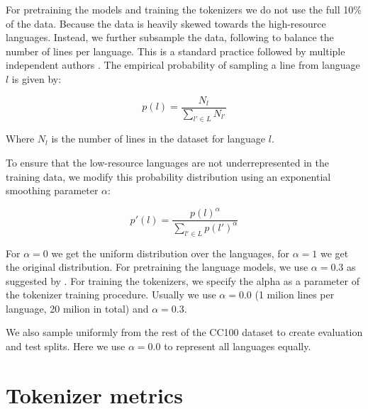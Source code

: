 
For pretraining the models and training the tokenizers we do not use the full 10\% of the data. Because the data is heavily skewed towards the high-resource languages. Instead, we further subsample the data, following \citet{conneau_unsupervised_2020-1} to balance the number of lines per language. This is a standard practice followed by multiple independent authors . The empirical probability of sampling a line from language $l$ is given by:

\begin{equation}
    p(l) = \frac{N_l}{\sum_{l' \in L} N_{l'}}
\end{equation}

Where $N_l$ is the number of lines in the dataset for language $l$.

To ensure that the low-resource languages are not underrepresented in the training data, we modify this probability distribution using an exponential smoothing parameter $\alpha$:

\begin{equation}
    p'(l) = \frac{p(l)^\alpha}{\sum_{l' \in L} p(l')^\alpha}
\end{equation}

For $\alpha = 0$ we get the uniform distribution over the languages, for $\alpha = 1$ we get the original distribution. For pretraining the language models, we use $\alpha = 0.3$ as suggested by \citet{conneau_unsupervised_2020-1}. For training the tokenizers, we specify the alpha as a parameter of the tokenizer training procedure. Usually we use $\alpha = 0.0$ (1 milion lines per language, 20 milion in total) and $\alpha = 0.3$.

We also sample uniformly from the rest of the CC100 dataset to create evaluation and test splits. Here we use $\alpha = 0.0$ to represent all languages equally.

\section{Tokenizer metrics}

